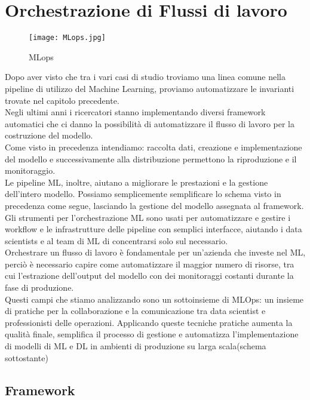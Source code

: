 \documentclass[../tesi.tex]{subfiles}
\begin{document}
\chapter{Orchestrazione di Flussi di lavoro}
\begin{figure}[htbp]
  \centering
  \texttt{[image: MLops.jpg]} 
  \caption{MLops}
  \end{figure}

Dopo aver visto che tra i vari casi di studio troviamo una linea comune nella pipeline di utilizzo del Machine Learning, proviamo automatizzare le invarianti trovate nel capitolo precedente.\\
Negli ultimi anni i ricercatori stanno implementando diversi framework automatici che ci danno la possibilità di automatizzare il flusso di lavoro per la costruzione del modello.\\
Come visto in precedenza intendiamo: raccolta dati, creazione e implementazione del modello e successivamente alla distribuzione permettono la riproduzione e il monitoraggio.\\
Le pipeline ML, inoltre, aiutano a migliorare le prestazioni e la gestione dell'intero modello.
Possiamo semplicemente semplificare lo schema visto in precedenza come segue, lasciando la gestione del modello assegnata al framework.\\
Gli strumenti per l’orchestrazione ML sono usati per automatizzare e gestire i workflow e le infrastrutture delle pipeline con semplici interfacce, aiutando i data scientists e al team di ML di concentrarsi solo sul necessario.\\
Orchestrare un flusso di lavoro è fondamentale per un’azienda che investe nel ML, perciò è necessario capire come automatizzare il maggior numero di risorse, tra cui l’estrazione dell’output del modello con dei monitoraggi costanti durante la fase di produzione.\\
Questi campi che stiamo analizzando sono un sottoinsieme di MLOps: un insieme di pratiche per la collaborazione e la comunicazione tra data scientist e professionisti delle operazioni. Applicando queste tecniche pratiche aumenta la qualità finale, semplifica il processo di gestione e automatizza l’implementazione di modelli di ML e DL in ambienti di produzione su larga scala(schema sottostante)

  \section{Framework}
\end{document}
